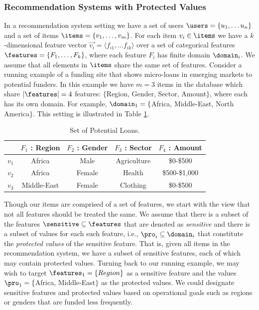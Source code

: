 \subsubsection{\textbf{Recommendation Systems with Protected Values}}
\hfill

In a recommendation system setting we have a set of users $\users = \{u_1, \ldots u_n\}$ and a set of items $\items = \{v_1, \ldots, v_m\}$. For each item $v_i \in \items$ we have a $k$-dimensional feature vector $\vec{v_i} = \langle f_{i1}, \ldots f_{ik} \rangle$ over a set of categorical features $\features = \{F_1, \ldots, F_k\}$, where each feature $F_i$ has finite domain $\domain_i$. We assume that all elements in $\items$ share the same set of features. 
%
Consider a running example of a funding site that shows micro-loans in emerging markets to potential funders. In this example we have $m=3$ items in the database which share $|\features|=4$ features: $\{$Region, Gender, Sector, Amount$\}$, where each has its own domain.  For example, $\domain_1 = \{$Africa, Middle-East, North America$\}$.  This setting is illustrated in Table \ref{table:user_profile}.
    
\begin{table}
    \begin{tabular}{|c|c|c|c|c|}
    \hline
            & $F_{1}$ : Region & $F_{2}$ : Gender & $F_{3}$ : Sector & $F_{4}$ : Amount \\
    \hline
        $v_1$ & Africa & Male & Agriculture & \$0-\$500\\
    \hline
        $v_2$ & Africa & Female & Health & \$500-\$1,000\\
    \hline
        $v_3$ & Middle-East & Female & Clothing & \$0-\$500 \\
    \hline
    \end{tabular}
    \caption{Set of Potential Loans.}
    \label{table:user_profile}
\end{table}

Though our items are comprised of a set of features, we start with the view that not all features should be treated the same. We assume that there is a subset of the features $\sensitive \subseteq \features$ that are denoted as \textit{sensitive} and there is a subset of values for each such feature, i.e., $\pro_i \subseteq \domain_i$ that constitute the \emph{protected values} of the sensitive feature. That is, given all items in the recommendation system, we have a subset of sensitive features, each of which may contain protected values. Turning back to our running example, we may wish to target $\features_1=\{Region\}$ as a sensitive feature and the values $\pro_1=\{$Africa, Middle-East$\}$ as the protected values. We could designate sensitive features and protected values based on operational goals such as regions or genders that are funded less frequently.

